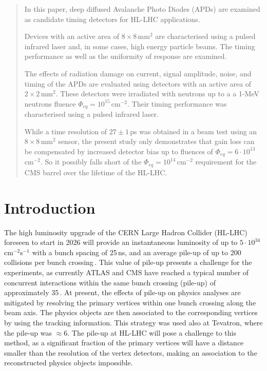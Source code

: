 \documentclass[review,number,sort&compress]{elsarticle}
\begin{document}
\begin{frontmatter}
\begin{abstract}
In this paper, deep diffused Avalanche Photo Diodes (APDs) are examined as candidate timing detectors for HL-LHC applications.

Devices with an active area of $8 \times 8$\,mm$^2$ are characterised using a pulsed infrared laser and, in some cases, high energy particle beams.
The timing performance as well as the uniformity of response are examined.

The effects of radiation damage on current, signal amplitude, noise, and timing of the APDs are evaluated using detectors with an active area of $2 \times 2$\,mm$^2$.
These detectors were irradiated with neutrons up to a a 1-MeV neutrons fluence $\Phi_{eq} = 10^{15}$\,cm$^{-2}$.
Their timing performance was characterised using a pulsed infrared laser.

While a time resolution of $27 \pm 1$\,ps was obtained in a beam test using an $8 \times 8$\,mm$^2$ sensor, the present study only demonstrates that gain loss can be compensated by increased detector bias up to fluences of $\Phi_{eq} = 6 \cdot 10^{13}$\,cm$^{-2}$.
So it possibly falls short of the $\Phi_{eq} = 10^{14}$\,cm$^{-2}$ requirement for the CMS barrel over the lifetime of the HL-LHC.

\end{abstract}

\end{frontmatter}

\section{Introduction}

The high luminosity upgrade of the CERN Large Hadron Collider (HL-LHC) foreseen to start in 2026 will provide an instantaneous luminosity of up to $5 \cdot 10^{34}$\,cm$^{-2}$s$^{-1}$ with a bunch spacing of 25\,ns, and an average pile-up of up to 200 collisions per bunch crossing\,\cite{hlLhcTecDesRep}.
This value of pile-up presents a challenge for the experiments, as currently ATLAS and CMS have reached a typical number of concurrent interactions within the same bunch crossing (pile-up) of approximately 35\,\cite{atlasPileup,cmsPileup}.
At present, the effects of pile-up on physics analyses are mitigated by resolving the primary vertices within one bunch crossing along the beam axis.
The physics objects are then associated to the corresponding vertices by using the tracking information.
This strategy was used also at Tevatron, where the pile-up was $\approx 6$.
The pile-up at HL-LHC will pose a challenge to this method, as a significant fraction of the primary vertices will have a distance smaller than the resolution of the vertex detectors, making an association to the reconstructed physics objects impossible.
\end{document}
